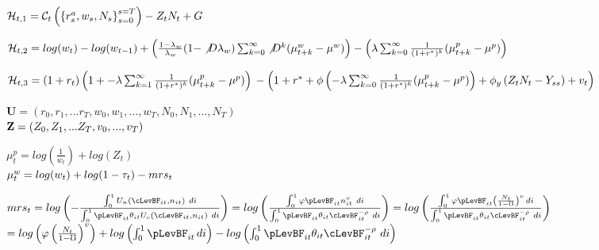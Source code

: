 \documentclass[titlepage]{\econtex}\providecommand{\texname}{BufferStockTheory}
\begin{document}
 
 $\mathcal{H}_{t,1}  =\mathcal{C}_{t}\left( \left \{r^{a}_{s} , w_{s} , N_{s}  \right \}_{s=0}^{s=T} \right) - Z_{t} N_{t} + G\\ \\ $

$ \mathcal{H}_{t,2}  =log(w_{t}) - log(w_{t-1}) + \left( \frac{1 - \lambda_{w}}{\lambda_{w}}(1 - \not D \lambda_{w}) \sum_{k=0}^{\infty} \not D^{k} ( \mu_{t+k}^{w} - \mu^{w}) \right) - \left(  \lambda \sum_{k=0}^{\infty} \frac{1}{(1+r^{*})^{k}} ( \mu_{t+k}^{p} - \mu^{p})\right)\\ \\ $

$ \mathcal{H}_{t,3}  =  (1+r_{t}) \left(1+ -\lambda \sum_{k=1}^{\infty} \frac{1}{(1+r^{*})^{k}} ( \mu_{t+k}^{p} - \mu^{p}) \right) \\ \\
 - \left(1+r^{*}+ \phi \left(- \lambda \sum_{k=0}^{\infty} \frac{1}{(1+r^{*})^{k}} ( \mu_{t+k}^{p} - \mu^{p}) \right) +\phi_{y} \left(Z_{t} N_{t} - Y_{ss} \right) + v_{t}\right) \\ \\ $
 
$\mathbf{U} = (r_{0} , r_{1} , ...r_{T}, w_{0}, w_{1}, ..., w_{T}, N_{0}, N_{1},...,N_{T})$ \\ 

$ \mathbf{Z} = ( Z_{0}, Z_{1},... Z_{T}, v_{0},...,v_{T}) \\ \\ $ 

$ \mu_{t}^{p} = log(\frac{1}{w_{t}}) + log(Z_{t})$ \\ 

$\mu_{t}^{w} = log(w_{t}) + log(1 - \tau_{t}) - mrs_{t} \\ \\ $


$mrs_{t} = log \left(- \frac{\int_{0}^{1}   U_{n} \left(\cLevBF_{i t}, n_{i t} \right) \ d i  }{\int_{0}^{1} \pLevBF_{it} \theta_{it} U_{c} \left(\cLevBF_{i t}, n_{i t} \right) \  di } \right) = log \left(\frac{\int_{0}^{1} \varphi \pLevBF_{it} n_{it}^{v} \ d i  }{\int_{0}^{1} \pLevBF_{it}  \theta_{it} \cLevBF_{it}^{-\rho} \  di } \right) = log \left(\frac{\int_{0}^{1} \varphi \pLevBF_{it} \left(\frac{N_{t}}{1 - \mho} \right)^{v} \, d i  }{\int_{0}^{1} \pLevBF_{it}  \theta_{it} \cLevBF_{it}^{-\rho} \  di } \right)$ \\ 

$ = log \left( \varphi \left(\frac{N_{t}}{1 - \mho}\right) ^{v}\right) + log \left(\int_{0}^{1} \pLevBF_{it}  \,  di  \right) - log \left(\int_{0}^{1} \pLevBF_{it}  \theta_{it} \cLevBF_{it}^{-\rho} \  di  \right) $
\end{document}
